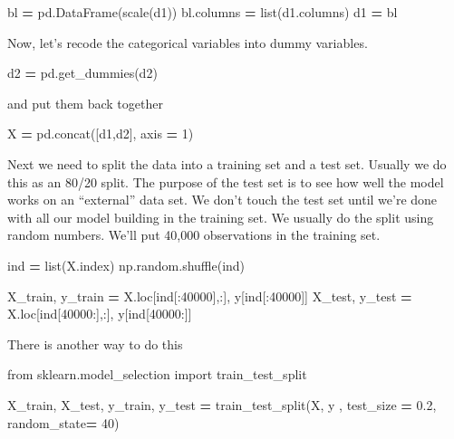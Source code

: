 \documentclass[
  letterpaper,
]{scrbook}
\newenvironment{Shaded}{\begin{snugshade}}{\end{snugshade}}
\newcommand{\BuiltInTok}[1]{#1}
\newcommand{\DecValTok}[1]{\textcolor[rgb]{0.00,0.00,0.81}{#1}}
\newcommand{\FloatTok}[1]{\textcolor[rgb]{0.00,0.00,0.81}{#1}}
\newcommand{\ImportTok}[1]{#1}
\newcommand{\NormalTok}[1]{#1}
\newcommand{\OperatorTok}[1]{\textcolor[rgb]{0.81,0.36,0.00}{\textbf{#1}}}
\begin{document}
\begin{Shaded}
\begin{Highlighting}[]
\NormalTok{bl }\OperatorTok{=}\NormalTok{ pd.DataFrame(scale(d1))}
\NormalTok{bl.columns }\OperatorTok{=} \BuiltInTok{list}\NormalTok{(d1.columns)}
\NormalTok{d1 }\OperatorTok{=}\NormalTok{ bl}
\end{Highlighting}
\end{Shaded}

Now, let's recode the categorical variables into dummy variables.

\begin{Shaded}
\begin{Highlighting}[]
\NormalTok{d2 }\OperatorTok{=}\NormalTok{ pd.get_dummies(d2)}
\end{Highlighting}
\end{Shaded}

and put them back together

\begin{Shaded}
\begin{Highlighting}[]
\NormalTok{X }\OperatorTok{=}\NormalTok{ pd.concat([d1,d2], axis }\OperatorTok{=} \DecValTok{1}\NormalTok{)}
\end{Highlighting}
\end{Shaded}

Next we need to split the data into a training set and a test set. Usually we do this as an 80/20 split.
The purpose of the test set is to see how well the model works on an ``external'' data set. We don't touch the
test set until we're done with all our model building in the training set. We usually do the split using
random numbers. We'll put 40,000 observations in the training set.

\begin{Shaded}
\begin{Highlighting}[]
\NormalTok{ind }\OperatorTok{=} \BuiltInTok{list}\NormalTok{(X.index)}
\NormalTok{np.random.shuffle(ind)}

\NormalTok{X_train, y_train }\OperatorTok{=}\NormalTok{ X.loc[ind[:}\DecValTok{40000}\NormalTok{],:], y[ind[:}\DecValTok{40000}\NormalTok{]]}
\NormalTok{X_test, y_test }\OperatorTok{=}\NormalTok{ X.loc[ind[}\DecValTok{40000}\NormalTok{:],:], y[ind[}\DecValTok{40000}\NormalTok{:]]}
\end{Highlighting}
\end{Shaded}

There is another way to do this

\begin{Shaded}
\begin{Highlighting}[]
\ImportTok{from}\NormalTok{ sklearn.model_selection }\ImportTok{import}\NormalTok{ train_test_split}

\NormalTok{X_train, X_test, y_train, y_test }\OperatorTok{=}\NormalTok{ train_test_split(X, y , test_size }\OperatorTok{=} \FloatTok{0.2}\NormalTok{, random_state}\OperatorTok{=} \DecValTok{40}\NormalTok{)}
\end{Highlighting}
\end{Shaded}
\end{document}

